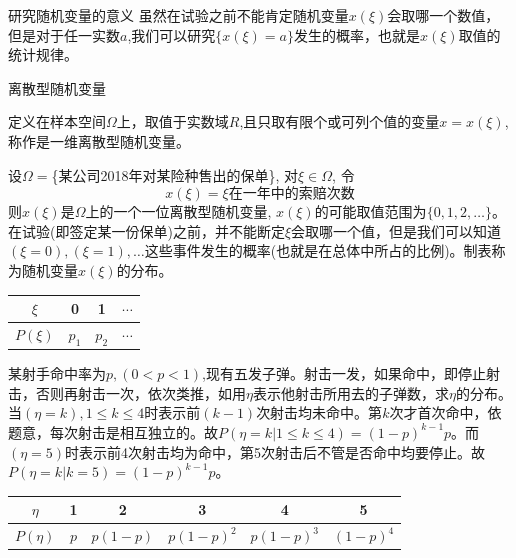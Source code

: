 \documentclass[xcolor=svgnames,serif,table,10pt]{beamer}
\begin{document}
\begin{frame}{研究随机变量的意义}
  虽然在试验之前不能肯定随机变量$x(\xi)$会取哪一个数值，但是对于任一实数$a$,我们可以研究$\{x(\xi)=a\}$发生的概率，也就是$x(\xi)$取值的统计规律。
\end{frame}
\begin{frame}{离散型随机变量}
	\begin{definition}
		定义在样本空间$\Omega$上，取值于实数域$R$,且只取有限个或可列个值的变量$x=x(\xi)$, 称作是一维离散型随机变量。
	\end{definition}
	\begin{example}
		设$\Omega=$\{某公司2018年对某险种售出的保单\}, 对$\xi\in\Omega$, 令
		\[x(\xi)=\xi\text{在一年中的索赔次数}\]
		则$x(\xi)$是$\Omega$上的一个一位离散型随机变量, $x(\xi)$的可能取值范围为$\{0,1,2,\dots\}$。 在试验(即签定某一份保单)之前，并不能断定$\xi$会取哪一个值，但是我们可以知道$(\xi=0),(\xi=1),\dots$这些事件发生的概率(也就是在总体中所占的比例)。制表称为随机变量$x(\xi)$的分布。
		\begin{tabular}{|c|c|c|c|}
			\hline 
			$\xi$ & 0 & 1 & $\cdots$\\ 
			\hline 
			$P(\xi)$ & $p_1$ & $p_2$ & $\cdots$\\ 
			\hline 
		\end{tabular} 
	\end{example}
\end{frame}
\begin{frame}
\begin{example}
	某射手命中率为$p,(0<p<1)$,现有五发子弹。射击一发，如果命中，即停止射击，否则再射击一次，依次类推，如用$\eta$表示他射击所用去的子弹数，求$\eta$的分布。\\
	当$(\eta=k),1\le k\le 4$时表示前$(k-1)$次射击均未命中。第$k$次才首次命中，依题意，每次射击是相互独立的。故$P(\eta=k| 1\le k\le 4)=(1-p)^{k-1}p$。而$(\eta=5)$时表示前4次射击均为命中，第5次射击后不管是否命中均要停止。故$P(\eta=k|k=5)=(1-p)^{k-1}p$。\\
	\begin{tabular}{|c|c|c|c|c|c|}
		\hline 
		$\eta$ & 1 & 2 & 3 & 4 & 5\\ 
		\hline 
		$P(\eta)$ & $p$ & $p(1-p)$ & $p(1-p)^2$ & $p(1-p)^3$  & $(1-p)^4$ \\ 
		\hline 
	\end{tabular} 
\end{example}
\end{frame}
\end{document}

